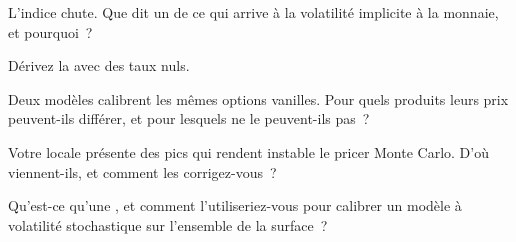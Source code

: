 \begin{interviewq}\label{iq:dv:local-volatility:2}
L'indice chute. Que dit un  de ce qui arrive à la volatilité implicite à la monnaie, et pourquoi~?
\end{interviewq}

\begin{interviewq}\label{iq:dv:local-volatility:3}
Dérivez la  avec des taux nuls.
\end{interviewq}

\begin{interviewq}\label{iq:dv:local-volatility:4}
Deux modèles calibrent les mêmes options vanilles. Pour quels produits leurs prix peuvent-ils différer, et pour lesquels ne le peuvent-ils pas~?
\end{interviewq}

\begin{interviewq}\label{iq:dv:local-volatility:5}
Votre  locale présente des pics qui rendent instable le pricer Monte Carlo. D'où viennent-ils, et
comment les corrigez-vous~?
\end{interviewq}

\begin{interviewq}\label{iq:dv:local-volatility:6}
Qu'est-ce qu'une , et comment l'utiliseriez-vous pour calibrer un modèle à volatilité stochastique
sur l'ensemble de la surface~?
\end{interviewq}
